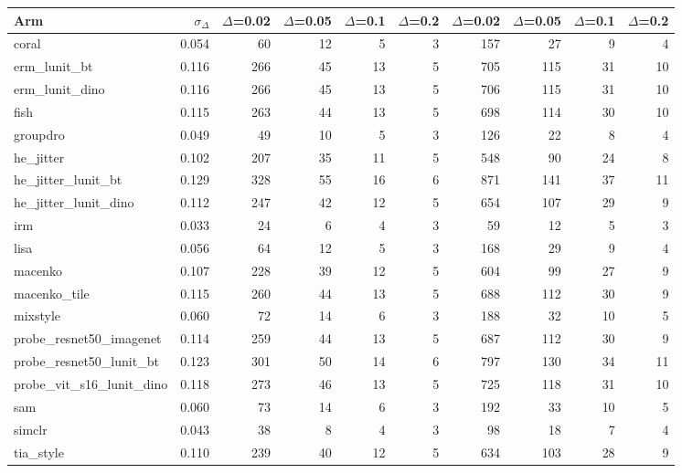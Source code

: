 \begin{tabular}{lrrrrrrrrr}
\toprule
Arm & $\sigma_\Delta$ & $\Delta$=0.02 & $\Delta$=0.05 & $\Delta$=0.1 & $\Delta$=0.2 & $\Delta$=0.02 & $\Delta$=0.05 & $\Delta$=0.1 & $\Delta$=0.2 \\
\midrule
coral & 0.054 & 60 & 12 & 5 & 3 & 157 & 27 & 9 & 4 \\
erm\_lunit\_bt & 0.116 & 266 & 45 & 13 & 5 & 705 & 115 & 31 & 10 \\
erm\_lunit\_dino & 0.116 & 266 & 45 & 13 & 5 & 706 & 115 & 31 & 10 \\
fish & 0.115 & 263 & 44 & 13 & 5 & 698 & 114 & 30 & 10 \\
groupdro & 0.049 & 49 & 10 & 5 & 3 & 126 & 22 & 8 & 4 \\
he\_jitter & 0.102 & 207 & 35 & 11 & 5 & 548 & 90 & 24 & 8 \\
he\_jitter\_lunit\_bt & 0.129 & 328 & 55 & 16 & 6 & 871 & 141 & 37 & 11 \\
he\_jitter\_lunit\_dino & 0.112 & 247 & 42 & 12 & 5 & 654 & 107 & 29 & 9 \\
irm & 0.033 & 24 & 6 & 4 & 3 & 59 & 12 & 5 & 3 \\
lisa & 0.056 & 64 & 12 & 5 & 3 & 168 & 29 & 9 & 4 \\
macenko & 0.107 & 228 & 39 & 12 & 5 & 604 & 99 & 27 & 9 \\
macenko\_tile & 0.115 & 260 & 44 & 13 & 5 & 688 & 112 & 30 & 9 \\
mixstyle & 0.060 & 72 & 14 & 6 & 3 & 188 & 32 & 10 & 5 \\
probe\_resnet50\_imagenet & 0.114 & 259 & 44 & 13 & 5 & 687 & 112 & 30 & 9 \\
probe\_resnet50\_lunit\_bt & 0.123 & 301 & 50 & 14 & 6 & 797 & 130 & 34 & 11 \\
probe\_vit\_s16\_lunit\_dino & 0.118 & 273 & 46 & 13 & 5 & 725 & 118 & 31 & 10 \\
sam & 0.060 & 73 & 14 & 6 & 3 & 192 & 33 & 10 & 5 \\
simclr & 0.043 & 38 & 8 & 4 & 3 & 98 & 18 & 7 & 4 \\
tia\_style & 0.110 & 239 & 40 & 12 & 5 & 634 & 103 & 28 & 9 \\
\bottomrule
\end{tabular}
